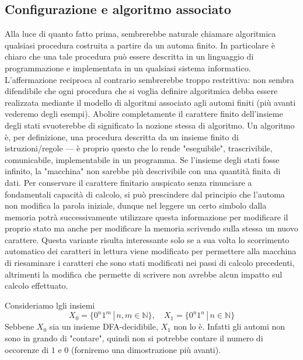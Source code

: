 \subsection{Configurazione e algoritmo associato}
Alla luce di quanto fatto prima, sembrerebbe naturale chiamare algoritmica qualsiasi procedura costruita a partire da un
automa finito.
In particolare è chiaro che una tale procedura può essere descritta in un linguaggio di
programmazione e implementata in un qualsiasi sistema informatico. L’affermazione reciproca al contrario
sembrerebbe troppo restrittiva: non sembra difendibile che ogni procedura che si voglia definire algoritmica
debba essere realizzata mediante il modello di algoritmi associato agli automi finiti (più avanti vederemo degli esempi). 
Abolire completamente il carattere finito dell’insieme degli stati
svuoterebbe di significato la nozione stessa di algoritmo. Un algoritmo è, per definizione, una procedura descritta da un insieme finito di istruzioni/regole — è proprio questo che lo rende "eseguibile", trascrivibile, comunicabile, implementabile in un programma. Se l'insieme degli stati fosse infinito, la "macchina" non sarebbe più descrivibile con una quantità finita di dati.
Per conservare il carattere finitario auspicato senza rinunciare a fondamentali
capacità di calcolo, si può prescindere dal principio che l’automa non modifica la parola iniziale, dunque nel
leggere un certo simbolo dalla memoria potrà successivamente utilizzare questa informazione per modificare il
proprio stato ma anche per modificare la memoria scrivendo sulla stessa un nuovo carattere.
Questa variante
risulta interessante solo se a sua volta lo scorrimento automatico dei caratteri in lettura viene modificato per
permettere alla macchina di riesaminare i caratteri che sono stati modificati nei passi di calcolo precedenti,
altrimenti la modifica che permette di scrivere non avrebbe alcun impatto sul calcolo effettuato.
\begin{exam}
Consideriamo lgli insiemi
\[
X_0=
\{
0^n1^m \, | \, n,m \in \mathbb N
\},
\quad
X_1=
\{
0^n1^n \, | \, n \in \mathbb N
\} 
\]
Sebbene $X_0$ sia un insieme DFA-decidibile,
$X_1$ non lo è.
Infatti
gli automi non sono in grando di "contare",
quindi non si potrebbe contare il numero di occorenze di
$1$ e $0$
(forniremo una dimostrazione più avanti).
\end{exam}
